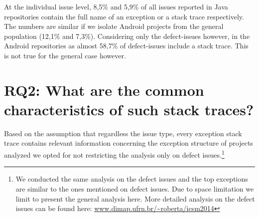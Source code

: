 \documentclass[conference]{IEEEtran}
\begin{document}
At the individual issue level, 8,5\% and 5,9\% of all issues reported in Java
repositories contain the full name of an exception or a stack trace
respectively. The numbers are similar if we isolate Android projects from the
general population (12,1\% and 7,3\%). Considering only the defect-issues
however, in the Android repositories as almost 58,7\% of defect-issues include a
stack trace. This is not true for the general case however.



\section{RQ2: What are the common characteristics of such stack traces?}




Based on the assumption that regardless the issue type, every exception stack
trace contains relevant information concerning the exception structure of
projects analyzed we opted for not restricting the analysis only on defect
issues.\footnote{We conducted the same analysis on the defect issues and the top
exceptions are similar to the ones mentioned on defect issues. Due to space
limitation we limit to present the general analysis here. More detailed analysis
on the defect issues can be found here:
\url{www.dimap.ufrn.br/~roberta/icsm2014}}
\end{document}
